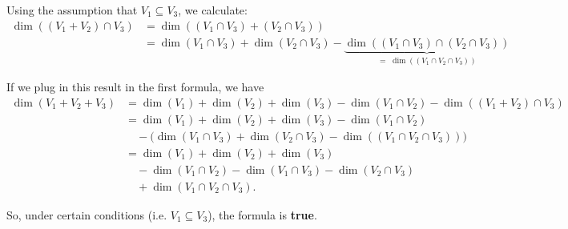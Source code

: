 \begin{xrcs}
  Using the assumption that $V_1 \subseteq V_3$, we calculate:
  \begin{equation}
    \begin{aligned}
      \dim ((V_1 + V_2) \cap V_3)
      &= \dim ((V_1 \cap V_3) + (V_2 \cap V_3)) \\
      &= \dim (V_1 \cap V_3) + \dim (V_2 \cap V_3) - \underbrace{\dim ((V_1 \cap V_3) \cap (V_2\cap V_3))}_{= \; \dim ((V_1 \cap V_2 \cap V_3))}
    \end{aligned}
  \end{equation}

  If we plug in this result in the first formula, we have
  \begin{equation}
    \begin{aligned}
      \dim (V_1 + V_2 + V_3)
      &= \dim (V_1) + \dim (V_2) + \dim (V_3) - \dim (V_1 \cap V_2) - \dim ((V_1 + V_2) \cap V_3) \\
      &= \dim (V_1) + \dim (V_2) + \dim (V_3) - \dim (V_1 \cap V_2) \\
      &\quad - \big(\dim (V_1 \cap V_3) + \dim (V_2 \cap V_3) - \dim ((V_1 \cap V_2 \cap V_3)) \big) \\
      &= \dim (V_1) + \dim (V_2) + \dim (V_3) \\
      & \quad - \dim(V_1 \cap V_2) - \dim (V_1 \cap V_3) - \dim (V_2 \cap V_3) \\
      & \quad + \dim (V_1 \cap V_2 \cap V_3).
    \end{aligned}
  \end{equation}

  So, under certain conditions (i.e. $V_1 \subseteq V_3$), the formula is \textbf{true}.
\end{xrcs}

